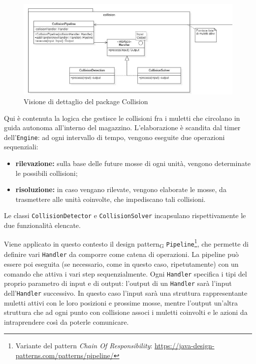 \begin{figure}[H]
	\centering
	\includegraphics[scale=0.50]{res/diagrams/server/server_pack_collision.jpg}
	\caption{Visione di dettaglio del package Collision}
\end{figure}


Qui è contenuta la logica che gestisce le collisioni fra i muletti che circolano in guida autonoma all'interno del magazzino. L'elaborazione è scandita dal timer dell'\texttt{Engine}: ad ogni intervallo di tempo, vengono eseguite due operazioni sequenziali:
\begin{itemize}
	\item \textbf{rilevazione:} sulla base delle future mosse di ogni unità, vengono determinate le possibili collisioni;
	\item \textbf{risoluzione:} in caso vengano rilevate, vengono elaborate le mosse, da trasmettere alle unità coinvolte, che impediscano tali collisioni.
\end{itemize}
Le classi \texttt{CollisionDetector} e \texttt{CollisionSolver} incapsulano rispettivamente le due funzionalità elencate.

Viene applicato in questo contesto il design pattern\textsubscript{G} \texttt{Pipeline}\footnote{Variante del pattern \textit{Chain Of Responsibility}: \url{https://java-design-patterns.com/patterns/pipeline/}}, che permette di definire vari \texttt{Handler} da comporre come catena di operazioni. La pipeline può essere poi eseguita (se necessario, come in questo caso, ripetutamente) con un comando che attiva i vari step sequenzialmente. Ogni \texttt{Handler} specifica i tipi del proprio parametro di input e di output: l'output di un \texttt{Handler} sarà l'input dell'\texttt{Handler} successivo.
In questo caso l'input sarà una struttura rappresentante muletti attivi con le loro posizioni e prossime mosse, mentre l'output un'altra struttura che ad ogni punto con collisione associ i muletti coinvolti e le azioni da intraprendere così da poterle comunicare.

